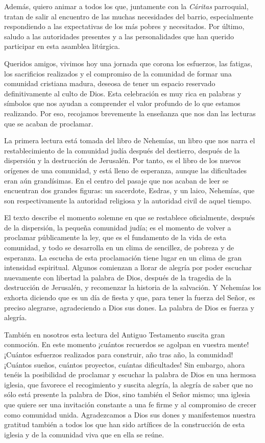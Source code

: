 Además, quiero animar a todos los que, juntamente con la \emph{Cáritas} parroquial, tratan de salir al encuentro de las muchas necesidades del barrio, especialmente respondiendo a las expectativas de los más pobres y necesitados. Por último, saludo a las autoridades presentes y a las personalidades que han querido participar en esta asamblea litúrgica.

Queridos amigos, vivimos hoy una jornada que corona los esfuerzos, las fatigas, los sacrificios realizados y el compromiso de la comunidad de formar una comunidad cristiana madura, deseosa de tener un espacio reservado definitivamente al culto de Dios. Esta celebración es muy rica en palabras y símbolos que nos ayudan a comprender el valor profundo de lo que estamos realizando. Por eso, recojamos brevemente la enseñanza que nos dan las lecturas que se acaban de proclamar.

La primera lectura está tomada del libro de Nehemías, un libro que nos narra el restablecimiento de la comunidad judía después del destierro, después de la dispersión y la destrucción de Jerusalén. Por tanto, es el libro de los nuevos orígenes de una comunidad, y está lleno de esperanza, aunque las dificultades eran aún grandísimas. En el centro del pasaje que nos acaban de leer se encuentran dos grandes figuras: un sacerdote, Esdras, y un laico, Nehemías, que son respectivamente la autoridad religiosa y la autoridad civil de aquel tiempo.

El texto describe el momento solemne en que se restablece oficialmente, después de la dispersión, la pequeña comunidad judía; es el momento de volver a proclamar públicamente la ley, que es el fundamento de la vida de esta comunidad, y todo se desarrolla en un clima de sencillez, de pobreza y de esperanza. La escucha de esta proclamación tiene lugar en un clima de gran intensidad espiritual. Algunos comienzan a llorar de alegría por poder escuchar nuevamente con libertad la palabra de Dios, después de la tragedia de la destrucción de Jerusalén, y recomenzar la historia de la salvación. Y Nehemías los exhorta diciendo que es un día de fiesta y que, para tener la fuerza del Señor, es preciso alegrarse, agradeciendo a Dios sus dones. La palabra de Dios es fuerza y alegría.

También en nosotros esta lectura del Antiguo Testamento suscita gran conmoción. En este momento ¡cuántos recuerdos se agolpan en vuestra mente! ¡Cuántos esfuerzos realizados para construir, año tras año, la comunidad! ¡Cuántos sueños, cuántos proyectos, cuántas dificultades! Sin embargo, ahora tenéis la posibilidad de proclamar y escuchar la palabra de Dios en una hermosa iglesia, que favorece el recogimiento y suscita alegría, la alegría de saber que no sólo está presente la palabra de Dios, sino también el Señor mismo; una iglesia que quiere ser una invitación constante a una fe firme y al compromiso de crecer como comunidad unida. Agradezcamos a Dios sus dones y manifestemos nuestra gratitud también a todos los que han sido artífices de la construcción de esta iglesia y de la comunidad viva que en ella se reúne.


